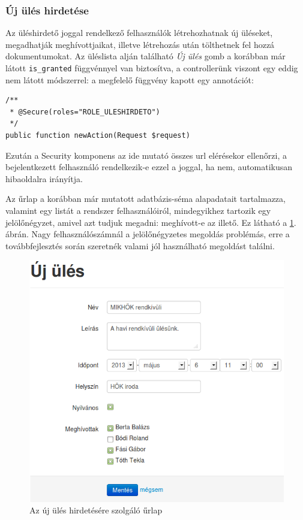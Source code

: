 \documentclass[a4paper,12pt,oneside]{report}
\begin{document}
\subsubsection*{Új ülés hirdetése}

Az üléshirdető joggal rendelkező felhasználók létrehozhatnak új üléseket, megadhatják meghívottjaikat, illetve létrehozás után tölthetnek fel hozzá dokumentumokat. Az üléslista alján található {\it Új ülés} gomb a korábban már látott {\tt is\_granted} függvénnyel van biztosítva, a controllerünk viszont egy eddig nem látott módszerrel: a megfelelő függvény kapott egy annotációt:

\begin{lstlisting}
/**
 * @Secure(roles="ROLE_ULESHIRDETO")
 */
public function newAction(Request $request)
\end{lstlisting}

Ezután a Security komponens az ide mutató összes url elérésekor ellenőrzi, a bejelentkezett felhasználó rendelkezik-e ezzel a joggal, ha nem, automatikusan hibaoldalra irányítja.

Az űrlap a korábban már mutatott adatbázis-séma alapadatait tartalmazza, valamint egy listát a rendszer felhasználóiról, mindegyikhez tartozik egy jelölőnégyzet, amivel azt tudjuk megadni: meghívott-e az illető. Ez látható a \ref{fig:ules_uj}. ábrán. Nagy felhasználószámnál a jelölőnégyzetes megoldás problémás, erre a továbbfejlesztés során szeretnék valami jól használható megoldást találni.

\begin{figure}[h]
    \includegraphics[width=\textwidth]{ules_uj.png}
    \caption{Az új ülés hirdetésére szolgáló űrlap}
    \label{fig:ules_uj}
\end{figure}
\end{document}
